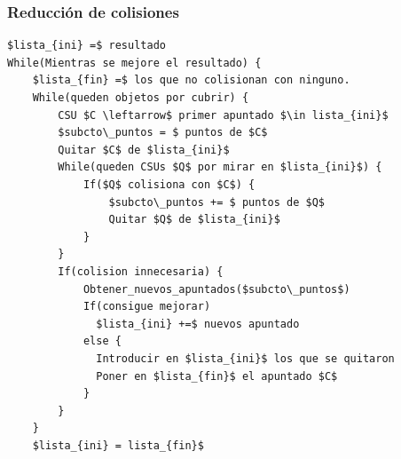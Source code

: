 \begin{frame}[fragile]
\frametitle{Reducción de colisiones}
\begin{lstlisting}[linewidth=\linewidth,
mathescape,numbers=none,basicstyle=\ttfamily\scriptsize]
$lista_{ini} =$ resultado
While(Mientras se mejore el resultado) {
    $lista_{fin} =$ los que no colisionan con ninguno.
    While(queden objetos por cubrir) {
        CSU $C \leftarrow$ primer apuntado $\in lista_{ini}$
        $subcto\_puntos = $ puntos de $C$
        Quitar $C$ de $lista_{ini}$
        While(queden CSUs $Q$ por mirar en $lista_{ini}$) {
            If($Q$ colisiona con $C$) {
                $subcto\_puntos += $ puntos de $Q$
                Quitar $Q$ de $lista_{ini}$
            }
        }
        If(colision innecesaria) {
            Obtener_nuevos_apuntados($subcto\_puntos$)
            If(consigue mejorar) 
              $lista_{ini} +=$ nuevos apuntado  
            else {
              Introducir en $lista_{ini}$ los que se quitaron
              Poner en $lista_{fin}$ el apuntado $C$
            }
        }
    }
    $lista_{ini} = lista_{fin}$
\end{lstlisting}
\end{frame}

